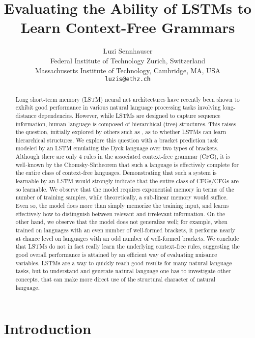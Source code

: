 \documentclass[11pt,a4paper]{article}
\title{Evaluating the Ability of LSTMs to Learn Context-Free Grammars}
\author{Luzi Sennhauser \\
  Federal Institute of Technology Zurich, Switzerland \\
  Massachusetts Institute of Technology, Cambridge, MA, USA \\
  {\tt luzis@ethz.ch}
}
\date{}
\begin{document}
\maketitle
\begin{abstract}
Long short-term memory (LSTM) neural net architectures have recently been shown to exhibit good performance in various natural language processing tasks involving long-distance dependencies. However, while LSTMs are designed to capture sequence information, human language is composed of hierarchical (tree) structures. This raises the question, initially explored by others such as \cite{linzen2016assessing}, as to whether LSTMs can learn hierarchical structures. We explore this question with a bracket prediction task modeled by an LSTM emulating the Dyck language over two types of brackets. Although there are only 4 rules in the associated context-free grammar (CFG), it is well-known by the Chomsky-Sh\utzenberger theorem\cite{chomsky1963algebraic, autebert1997context} that such a language is effectively complete for the entire class of context-free languages. Demonstrating that such a system is learnable by an LSTM would strongly indicate that the entire class of CFGs/CFGs are so learnable.  We observe that the model requires exponential memory in terms of the number of training samples, while theoretically, a sub-linear memory would suffice.
Even so, the model does more than simply memorize the training input, and learns effectively how to distinguish between relevant and irrelevant information. On the other hand, we observe that the model does not generalize well; for example, when trained on languages with an even number of well-formed brackets, it performs nearly at chance level on languages with an odd number of well-formed brackets.
We conclude that LSTMs do not in fact really learn the underlying context-free rules, suggesting the good overall performance is attained by an efficient way of evaluating nuisance variables. LSTMs are a way to quickly reach good results for many natural language tasks, but to understand and generate natural language one has to investigate other concepts, that can make more direct use of the structural character of natural language.
\end{abstract}

\section{Introduction}
\end{document}
